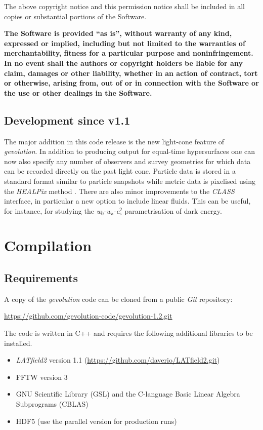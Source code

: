 \documentclass[a4paper,10pt]{article}
\begin{document}
The above copyright notice and this permission notice shall be included in
all copies or substantial portions of the Software.
  
\textbf{The Software is provided ``as is'', without warranty of any kind, expressed or
implied, including but not limited to the warranties of merchantability,
fitness for a particular purpose and noninfringement. In no event shall the
authors or copyright holders be liable for any claim, damages or other
liability, whether in an action of contract, tort or otherwise, arising from,
out of or in connection with the Software or the use or other dealings in
the Software.}

\subsection{Development since v1.1}

The major addition in this code release is the new light-cone feature of \textit{gevolution}. In addition to producing output for equal-time
hypersurfaces one can now also specify any number of observers and survey geometries for which data can be recorded directly on the past light cone.
Particle data is stored in a standard format similar to particle snapshots while metric data is pixelised using the \textit{HEALPix}
method \cite{Gorski:2004by}.
There are also minor improvements to the \textit{CLASS} interface, in particular a new option to include linear fluids. This can be useful, for instance,
for studying the \textit{w}$_\mathsf{0}$-\textit{w}$_\mathsf{a}$-\textit{c}$_\mathsf{s}^\mathsf{2}$ parametrisation of dark energy.


\section{Compilation}

\subsection{Requirements}

A copy of the \textit{gevolution} code can be cloned from a public \textit{Git} repository:

\url{https://github.com/gevolution-code/gevolution-1.2.git}

\noindent The code is written in C++ and requires the following additional libraries to be installed.

\begin{itemize}
 \item \textit{LATfield2} version 1.1 (\url{https://github.com/daverio/LATfield2.git})
 \item FFTW version 3
 \item GNU Scientific Library (GSL) and the C-language Basic Linear Algebra Subprograms (CBLAS)
 \item HDF5 (use the parallel version for production runs)
\end{itemize}
\end{document}
